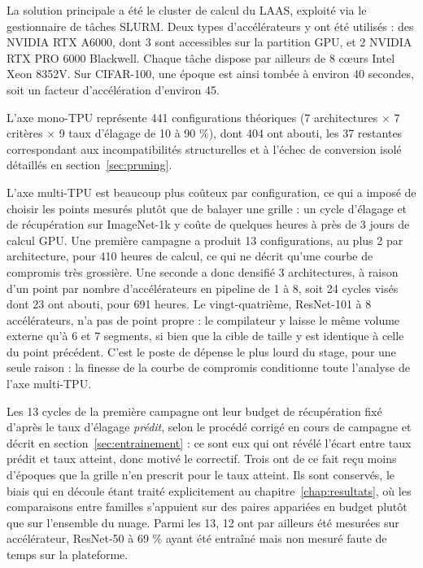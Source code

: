 \documentclass[11pt,a4paper]{report}
\begin{document}
La solution principale a été le cluster de calcul du LAAS, exploité via le gestionnaire de tâches SLURM. Deux types d'accélérateurs y ont été utilisés : des NVIDIA RTX A6000, dont 3 sont accessibles sur la partition GPU, et 2 NVIDIA RTX PRO 6000 Blackwell. Chaque tâche dispose par ailleurs de 8 c\oe{}urs Intel Xeon 8352V. Sur CIFAR-100, une époque est ainsi tombée à environ 40 secondes, soit un facteur d'accélération d'environ 45.

L'axe mono-TPU représente 441 configurations théoriques (7 architectures $\times$ 7 critères $\times$ 9 taux d'élagage de 10 à 90 \%), dont 404 ont abouti, les 37 restantes correspondant aux incompatibilités structurelles et à l'échec de conversion isolé détaillés en section~\ref{sec:pruning}.

L'axe multi-TPU est beaucoup plus coûteux par configuration, ce qui a imposé de choisir les points mesurés plutôt que de balayer une grille : un cycle d'élagage et de récupération sur ImageNet-1k y coûte de quelques heures à près de 3 jours de calcul GPU. Une première campagne a produit 13 configurations, au plus 2 par architecture, pour 410 heures de calcul, ce qui ne décrit qu'une courbe de compromis très grossière. Une seconde a donc densifié 3 architectures, à raison d'un point par nombre d'accélérateurs en pipeline de 1 à 8, soit 24 cycles visés dont 23 ont abouti, pour 691 heures. Le vingt-quatrième, ResNet-101 à 8 accélérateurs, n'a pas de point propre : le compilateur y laisse le même volume externe qu'à 6 et 7 segments, si bien que la cible de taille y est identique à celle du point précédent. C'est le poste de dépense le plus lourd du stage, pour une seule raison : la finesse de la courbe de compromis conditionne toute l'analyse de l'axe multi-TPU.

Les 13 cycles de la première campagne ont leur budget de récupération fixé d'après le taux d'élagage \emph{prédit}, selon le procédé corrigé en cours de campagne et décrit en section~\ref{sec:entrainement} : ce sont eux qui ont révélé l'écart entre taux prédit et taux atteint, donc motivé le correctif. Trois ont de ce fait reçu moins d'époques que la grille n'en prescrit pour le taux atteint. Ils sont conservés, le biais qui en découle étant traité explicitement au chapitre~\ref{chap:resultats}, où les comparaisons entre familles s'appuient sur des paires appariées en budget plutôt que sur l'ensemble du nuage. Parmi les 13, 12 ont par ailleurs été mesurées sur accélérateur, ResNet-50 à 69 \% ayant été entraîné mais non mesuré faute de temps sur la plateforme.
\end{document}
